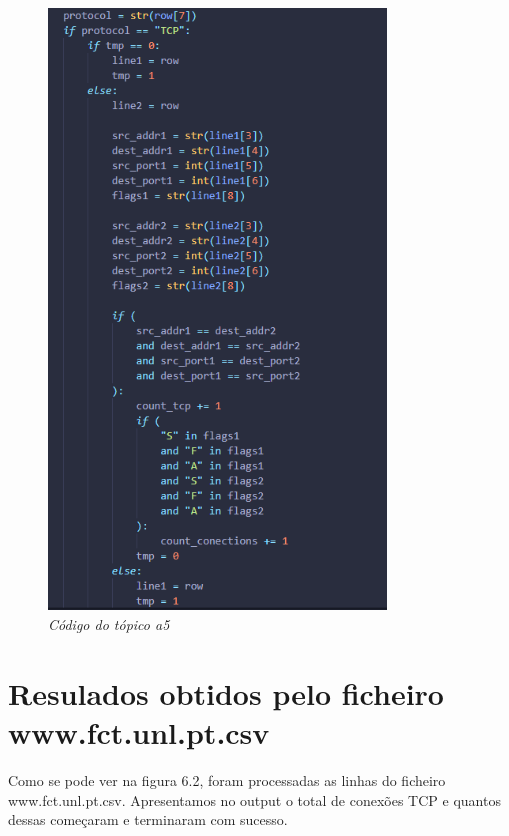 \begin{figure}[h!]
    \label{high}
    \centering
    \includegraphics[width=0.8\textwidth]{Images/a5/a5.png}
    \caption{\textit{Código do tópico a5}}
\end{figure}

\clearpage

\section{Resulados obtidos pelo ficheiro www.fct.unl.pt.csv}

Como se pode ver na figura 6.2, foram processadas as linhas do ficheiro www.fct.unl.pt.csv. Apresentamos no output o total de conexões TCP e quantos dessas começaram e terminaram com sucesso.

